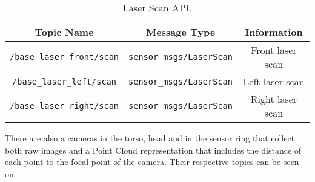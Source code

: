 \begin{table}[!ht]
\caption{Laser Scan API.} \label{tab:laserapi}
\centering
\renewcommand*{\arraystretch}{1.1}
\begin{tabular}{c|c|c}
Topic Name & Message Type & Information \\
\hline
\texttt{/base\_laser\_front/scan} & \texttt{sensor\_msgs/LaserScan} & Front laser scan \\ \hline
\texttt{/base\_laser\_left/scan} & \texttt{sensor\_msgs/LaserScan} & Left laser scan \\ \hline
\texttt{/base\_laser\_right/scan} & \texttt{sensor\_msgs/LaserScan} & Right laser scan \\ \hline
\end{tabular}
\end{table}

There are also a cameras in the torso, head and in the sensor ring that collect both raw images and a Point Cloud representation that includes the distance of each point to the focal point of the camera. Their respective topics can be seen on .

